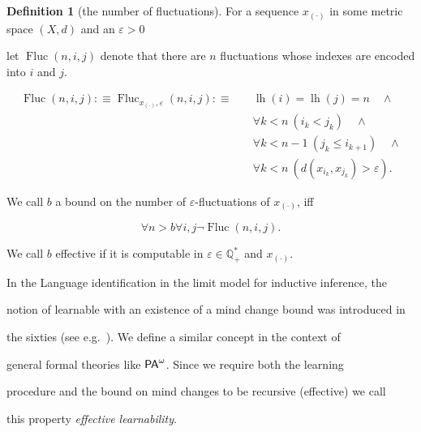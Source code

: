\documentclass[1p]{elsarticle}
\newcommand{\usftext}[1]{\textsf{\upshape #1}}
\DeclareMathOperator{\lh}{lh}  %
\DeclareMathOperator{\Fluc}{Fluc}
\newcommand{\QQ}{\ensuremath{\mathbb{Q}}}
\newcommand{\pa}{\ensuremath{{\usftext{PA}}^\omega}} %
\theoremstyle{plain}
\theoremstyle{definition}
\newtheorem{dfn}[thm]{Definition}
\theoremstyle{remark}
\renewcommand{\epsilon}{\varepsilon}
\theoremstyle{definition}
\begin{document}
\begin{dfn}[the number of fluctuations]

For a sequence $x_{(\cdot)}$ in some metric space $(X,d)$ and an $\epsilon>0$

let $\Fluc(n,i,j)$ denote that there are $n$ fluctuations whose indexes are encoded into $i$ and $j$.

\begin{align*}

\Fluc(n,i,j):\equiv\Fluc_{x_{(\cdot)},\epsilon}(n,i,j):\equiv\quad &\lh(i)=\lh(j)=n\quad \wedge\\ 

&\forall k<n\ (i_k<j_k) \quad \wedge\\

&\forall k<n-1\ (j_k\leq i_{k+1}) \quad \wedge\\

&\forall k<n\ (d(x_{i_k},x_{j_k})>\epsilon).

\end{align*}

We call $b$ a bound on the number of $\epsilon$-fluctuations of $x_{(\cdot)}$, iff 

\[

\forall n>b \forall i,j \neg\Fluc(n,i,j).

\]

We call $b$ effective if it is computable in $\epsilon\in\QQ^*_+$ and $x_{(\cdot)}$.

\end{dfn}



In the Language identification in the limit model for inductive inference, the 

notion of learnable with an existence of a mind change bound was introduced in 

the sixties (see e.g.~\cite{Gold(67)}). We define a similar concept in the context of 

general formal theories like $\pa$. Since we require both the learning 

procedure and the bound on mind changes to be recursive (effective) we call 

this property {\em effective learnability}. 
\end{document}
